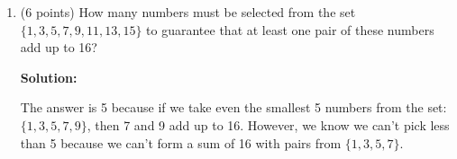 \documentclass[11pt]{article}
\begin{document}
\begin{enumerate}
\item (6 points) How many numbers must be selected from the set $\{1,3,5,7,9,11,13,15\}$ to guarantee that at least one pair of these numbers add up to 16?

\textbf{Solution: }

The answer is 5 because if we take even the smallest 5 numbers from the set: $\{1,3,5,7,9\}$, then 7 and 9 add up to 16.  However, we know we can't pick less than 5 because we can't form a sum of 16 with pairs from $\{1,3,5,7\}$.  

\end{enumerate}
\end{document}

